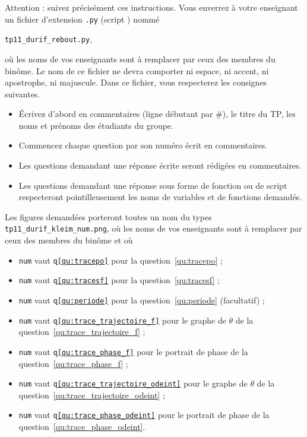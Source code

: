 Attention : suivez précisément ces instructions. Vous enverrez à votre enseignant un fichier d'extension  \texttt{.py} (script \python) nommé
\begin{center}
  \texttt{tp11\_durif\_rebout.py},
\end{center}
 où les noms de vos enseignants sont à remplacer par ceux des membres du binôme. Le nom de ce 
fichier ne devra comporter ni espace, ni accent, ni apostrophe, ni majuscule.
Dans ce fichier, vous respecterez les consignes suivantes.
\begin{itemize}
  \item \'Ecrivez d'abord en commentaires (ligne débutant par \#), le titre du TP, les noms et prénoms des étudiants du groupe.
  \item Commencez chaque question par son numéro écrit en commentaires.
  \item Les questions demandant une réponse écrite seront rédigées en commentaires.
  \item Les questions demandant une réponse sous forme de fonction ou de script respecteront pointilleusement les noms de variables et de fonctions demandés.
\end{itemize} 

Les figures demandées porteront toutes un nom du types \texttt{tp11\_durif\_kleim\_num.png}, où les noms de vos enseignants sont à remplacer par ceux des membres du binôme et où
\begin{itemize}
  \item \texttt{num} vaut \texttt{q\ref{qu:tracepo}} pour la question~\ref{qu:tracepo} ;
  \item \texttt{num} vaut \texttt{q\ref{qu:tracesf}} pour la question~\ref{qu:tracesf} ;
  \item \texttt{num} vaut \texttt{q\ref{qu:periode}} pour la question~\ref{qu:periode} (facultatif) ;
  \item \texttt{num} vaut \texttt{q\ref{qu:trace_trajectoire_f}} pour le graphe de $\theta$ de la question~\ref{qu:trace_trajectoire_f} ;
  \item \texttt{num} vaut \texttt{q\ref{qu:trace_phase_f}} pour le portrait de phase de la question~\ref{qu:trace_phase_f} ;
  \item \texttt{num} vaut \texttt{q\ref{qu:trace_trajectoire_odeint}} pour le graphe de $\theta$ de la question~\ref{qu:trace_trajectoire_odeint} ;
  \item \texttt{num} vaut \texttt{q\ref{qu:trace_phase_odeint}} pour le portrait de phase de la question~\ref{qu:trace_phase_odeint}.
\end{itemize}